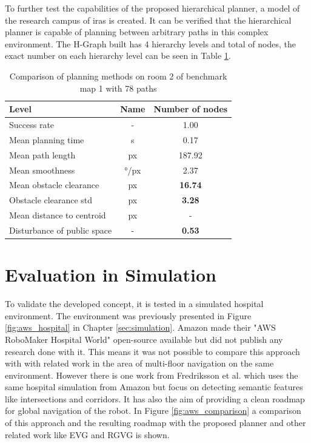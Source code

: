To further test the capabilities of the proposed hierarchical planner, a model of the research campus of \gls{iras} is created. It can be verified that the hierarchical planner is capable of planning between arbitrary paths in this complex environment. The H-Graph built has 4 hierarchy levels and total of  nodes, the exact number on each hierarchy level can be seen in Table \ref{tab:ltc_graph_nodes}.

\begin{table}[ht]
\centering
\begin{tabular}{lcc}
\hline
\textbf{Level} & \textbf{Name} & \textbf{Number of nodes} \\
\hline
Success rate & - & 1.00 \\
Mean planning time & s & 0.17\\
Mean path length & px & 187.92  \\
Mean smoothness & °/px & 2.37  \\
Mean obstacle clearance & px & \textbf{16.74}  \\
Obstacle clearance std & px & \textbf{3.28} \\
Mean distance to centroid & px & - \\
Disturbance of public space & - & \textbf{0.53} \\
\hline
\end{tabular}
\caption{Comparison of planning methods on room 2 of benchmark map 1 with 78 paths}
\label{tab:ltc_graph_nodes}
\end{table}

\section{Evaluation in Simulation}
\label{sec:evaluation_simulation}
To validate the developed concept, it is tested in a simulated hospital environment. The environment was previously presented in Figure \ref{fig:aws_hospital} in Chapter \ref{sec:simulation}. Amazon made their "AWS RoboMaker Hospital World" \cite{aws_robotics_aws_2023} open-source available but did not publish any research done with it. This means it was not possible to compare this approach with with related work in the area of multi-floor navigation on the same environment. However there is one work from Fredriksson et al. \cite{fredriksson_semantic_2023} which uses the same hospital simulation from Amazon but focus on detecting semantic features like intersections and corridors. It has also the aim of providing a clean roadmap for global navigation of the robot. In Figure \ref{fig:aws_comparison} a comparison of this approach and the resulting roadmap with the proposed planner and other related work like EVG and RGVG is shown.

